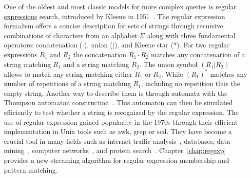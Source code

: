 One of the oldest and most classic models for more complex queries is \ul{regular expressions} search, introduced by Kleene in 1951~\cite{RM-704}.
The regular expression formalism offers a concise description for sets of strings through recursive combinations of characters from an alphabet $\Sigma$ along with three fundamental operators: concatenation ($\cdot$), union ($|$), and Kleene star ($\ast$).
For two regular expressions $R_1$ and $R_2$ the concatenation $R_1\cdot R_2$ matches any concatenation of a string matching $R_1$ and a string matching $R_2$. The union symbol $(R_1|R_2)$ allows to match any string matching either $R_1$ or $R_2$. While $(R_1)^\ast$ matches any number of repetitions of a string matching $R_1$, including no repetition thus the empty string.
Another way to describe them is through automata with the Thompson automaton construction~\cite{Thompson_automaton}. This automaton can then be simulated efficiently to test whether a string is recognized by the regular expression.
The use of regular expression gained popularity in the 1970s through their efficient implementation in Unix tools such as awk, grep or sed.
They have become a crucial tool in many fields such as internet traffic analysis~\cite{4221791,4579527}, databases, data mining~\cite{1000341,10.5555/645927.672035,10.1145/375551.375569}, computer networks~\cite{10.1145/1159913.1159952}, and protein search~\cite{10.1145/369133.369220}.
Chapter~\ref{chap:regexp} provides a new streaming algorithm for regular expression membership and pattern matching.

